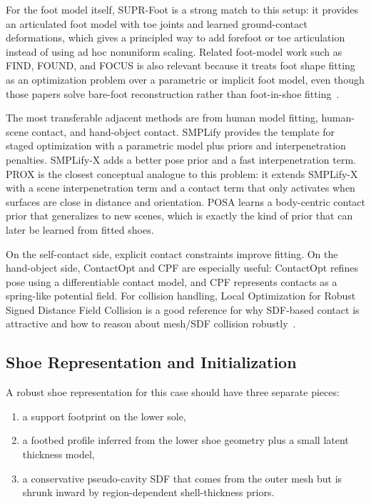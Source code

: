 \documentclass[11pt]{article}
\begin{document}
For the foot model itself, SUPR-Foot is a strong match to this setup: it provides an articulated foot model with toe joints and learned ground-contact deformations, which gives a principled way to add forefoot or toe articulation instead of using ad hoc nonuniform scaling. Related foot-model work such as FIND, FOUND, and FOCUS is also relevant because it treats foot shape fitting as an optimization problem over a parametric or implicit foot model, even though those papers solve bare-foot reconstruction rather than foot-in-shoe fitting~\cite{supr-foot,find,found,focus}.

The most transferable adjacent methods are from human model fitting, human-scene contact, and hand-object contact. SMPLify provides the template for staged optimization with a parametric model plus priors and interpenetration penalties. SMPLify-X adds a better pose prior and a fast interpenetration term. PROX is the closest conceptual analogue to this problem: it extends SMPLify-X with a scene interpenetration term and a contact term that only activates when surfaces are close in distance and orientation. POSA learns a body-centric contact prior that generalizes to new scenes, which is exactly the kind of prior that can later be learned from fitted shoes.

On the self-contact side, explicit contact constraints improve fitting. On the hand-object side, ContactOpt and CPF are especially useful: ContactOpt refines pose using a differentiable contact model, and CPF represents contacts as a spring-like potential field. For collision handling, Local Optimization for Robust Signed Distance Field Collision is a good reference for why SDF-based contact is attractive and how to reason about mesh/SDF collision robustly~\cite{smplify,smplifyx,prox,posa,self-contact,contactopt,cpf,sdf-collision,sdf-contact}.

\subsection{Shoe Representation and Initialization}

A robust shoe representation for this case should have three separate pieces:

\begin{enumerate}
  \item a support footprint on the lower sole,
  \item a footbed profile inferred from the lower shoe geometry plus a small latent thickness model,
  \item a conservative pseudo-cavity SDF that comes from the outer mesh but is shrunk inward by region-dependent shell-thickness priors.
\end{enumerate}
\end{document}
